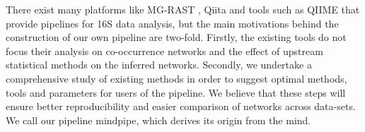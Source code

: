   There exist many platforms like MG-RAST \cite{Keegan2016}, Qiita \cite{qiita} and tools such as QIIME \cite{Caporaso2010} that provide pipelines for 16S data analysis, but the main motivations behind the construction of our own pipeline are two-fold.
  Firstly, the existing tools do not focus their analysis on co-occurrence networks and the effect of upstream statistical methods on the inferred networks.
  Secondly, we undertake a comprehensive study of existing methods in order to suggest optimal methods, tools and parameters for users of the pipeline.
  We believe that these steps will ensure better reproducibility and easier comparison of networks across data-sets.
  We call our pipeline mindpipe, which derives its origin from the \ac{mind}.
